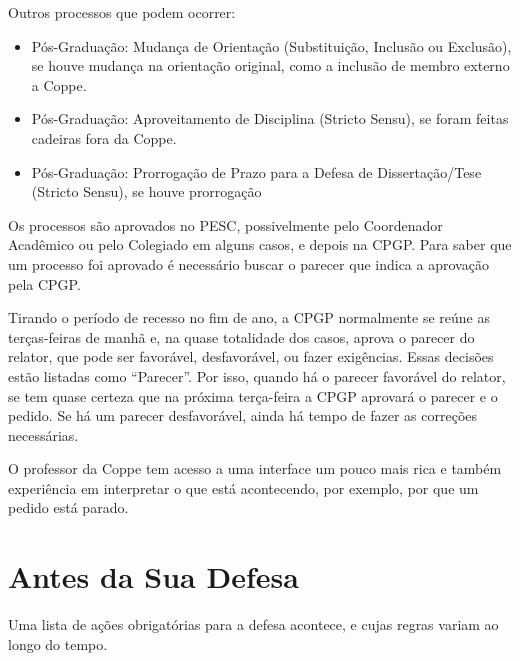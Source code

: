 Outros processos que podem ocorrer:
\begin{itemize}
    \item Pós-Graduação: Mudança de Orientação (Substituição, Inclusão ou Exclusão), se houve mudança na orientação original, como a inclusão de membro externo a Coppe.
    \item Pós-Graduação: Aproveitamento de Disciplina (Stricto Sensu), se foram feitas cadeiras fora da Coppe. 
        \item Pós-Graduação: Prorrogação de Prazo para a Defesa de Dissertação/Tese (Stricto Sensu), se houve prorrogação
\end{itemize}

Os processos são aprovados no PESC, possivelmente pelo Coordenador Acadêmico ou pelo Colegiado em alguns casos, e depois na CPGP. Para saber que um processo foi aprovado é necessário buscar o parecer que indica a aprovação pela CPGP. 

Tirando o período de recesso no fim de ano, a CPGP normalmente se reúne as terças-feiras de manhã e, na quase totalidade dos casos, aprova o parecer do relator, que pode ser favorável, desfavorável, ou fazer exigências. Essas decisões estão listadas como ``Parecer''. Por isso, quando há o parecer favorável do relator, se tem quase certeza que na próxima terça-feira a CPGP aprovará o parecer e o pedido. Se há um parecer desfavorável, ainda há tempo de fazer as correções necessárias.

O professor da Coppe tem acesso a uma interface um pouco mais rica e também experiência em interpretar o que está acontecendo, por exemplo, por que um pedido está parado.


\section{Antes da Sua Defesa}

Uma lista de ações obrigatórias para a defesa acontece, e cujas regras variam ao longo do tempo.

